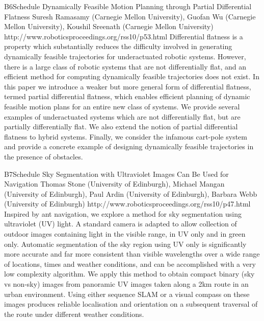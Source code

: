 \begin{spacing}{1.0}
\clearpage
\descriptionPaper
{B6}{Schedule}
{
Dynamically Feasible Motion Planning through Partial Differential Flatness
}
{
Suresh Ramasamy (Carnegie Mellon University), Guofan Wu (Carnegie Mellon University), Koushil Sreenath (Carnegie Mellon University)
}
{
http://www.roboticsproceedings.org/rss10/p53.html
}
{
Differential flatness is a property which substantially reduces the difficulty involved in generating dynamically feasible trajectories for underactuated robotic systems. However, there is a large class of robotic systems that are not differentially flat, and an efficient method for computing dynamically feasible trajectories does not exist. In this paper we introduce a weaker but more general form of differential flatness, termed partial differential flatness, which enables efficient planning of dynamic feasible motion plans for an entire new class of systems. We provide several examples of underactuated systems which are not differentially flat, but are partially differentially flat. We also extend the notion of partial differential flatness to hybrid systems. Finally, we consider the infamous cart-pole system and provide a concrete example of designing dynamically feasible trajectories in the presence of obstacles.
}


\descriptionPaper
{B7}{Schedule}
{
Sky Segmentation with Ultraviolet Images Can Be Used for Navigation
}
{
Thomas Stone (University of Edinburgh), Michael Mangan (University of Edinburgh), Paul Ardin (University of Edinburgh), Barbara Webb (University of Edinburgh)
}
{
http://www.roboticsproceedings.org/rss10/p47.html
}
{
Inspired by ant navigation, we explore a method for sky segmentation using ultraviolet (UV) light. A standard camera is adapted to allow collection of outdoor images containing light in the visible range, in UV only and in green only. Automatic segmentation of the sky region using UV only is significantly more accurate and far more consistent than visible wavelengths over a wide range of locations, times and weather conditions, and can be accomplished with a very low complexity algorithm. We apply this method to obtain compact binary (sky vs non-sky) images from panoramic UV images taken along a 2km route in an urban environment. Using either sequence SLAM or a visual compass on these images produces reliable localisation and orientation on a subsequent traversal of the route under different weather conditions.
}




\end{spacing}
